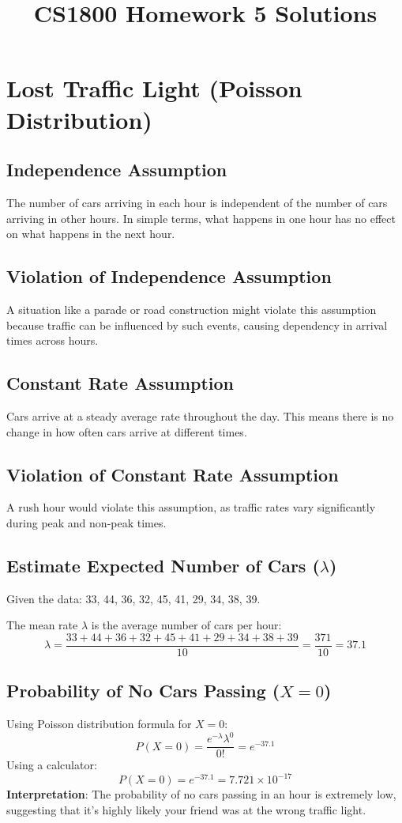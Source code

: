 \documentclass{article}
\title{CS1800 Homework 5 Solutions}
\author{}
\date{}
\begin{document}
\maketitle
\newpage

\section{Lost Traffic Light (Poisson Distribution)}

\subsection{Independence Assumption}
The number of cars arriving in each hour is independent of the number of cars arriving in other hours. In simple terms, what happens in one hour has no effect on what happens in the next hour.

\subsection{Violation of Independence Assumption}
A situation like a parade or road construction might violate this assumption because traffic can be influenced by such events, causing dependency in arrival times across hours.

\subsection{Constant Rate Assumption}
Cars arrive at a steady average rate throughout the day. This means there is no change in how often cars arrive at different times.

\subsection{Violation of Constant Rate Assumption}
A rush hour would violate this assumption, as traffic rates vary significantly during peak and non-peak times.

\subsection{Estimate Expected Number of Cars (\( \lambda \))}
Given the data: 33, 44, 36, 32, 45, 41, 29, 34, 38, 39.

The mean rate \( \lambda \) is the average number of cars per hour:
\[
\lambda = \frac{33 + 44 + 36 + 32 + 45 + 41 + 29 + 34 + 38 + 39}{10} = \frac{371}{10} = 37.1
\]

\subsection{Probability of No Cars Passing (\( X = 0 \))}
Using Poisson distribution formula for \( X = 0 \):
\[
P(X = 0) = \frac{e^{-\lambda} \lambda^0}{0!} = e^{-37.1}
\]
Using a calculator:
\[
P(X = 0) = e^{-37.1} = 7.721 \times 10^{-17}
\]
\textbf{Interpretation}: The probability of no cars passing in an hour is extremely low, suggesting that it’s highly likely your friend was at the wrong traffic light.
\end{document}
